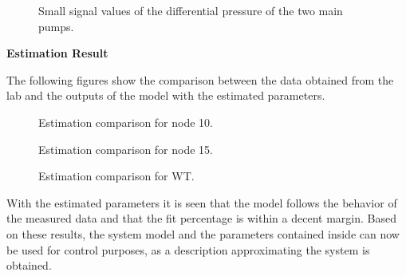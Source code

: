 \begin{figure}[H]
\centering
 
\caption{Small signal values of the differential pressure of the two main pumps.}
\label{fig:est_deltap_data_final}
\end{figure}



\textbf{Estimation Result}

The following figures show the comparison between the data obtained from the lab and the outputs of the model with the estimated parameters.  

\begin{figure}[H]
  \centering
    
    \caption{Estimation comparison for node 10.}
\end{figure}


\begin{figure}[H]
   \centering
    
    \caption{Estimation comparison for node 15.}
\end{figure}


\begin{figure}[H]
   \centering
    
    \caption{Estimation comparison for WT.}
\end{figure}


With the estimated parameters it is seen that the model follows the behavior of the measured data and that the fit percentage is within a decent margin. 
Based on these results, the system model and the parameters contained inside can now be used for control purposes, as a description approximating the 
system is obtained.   

